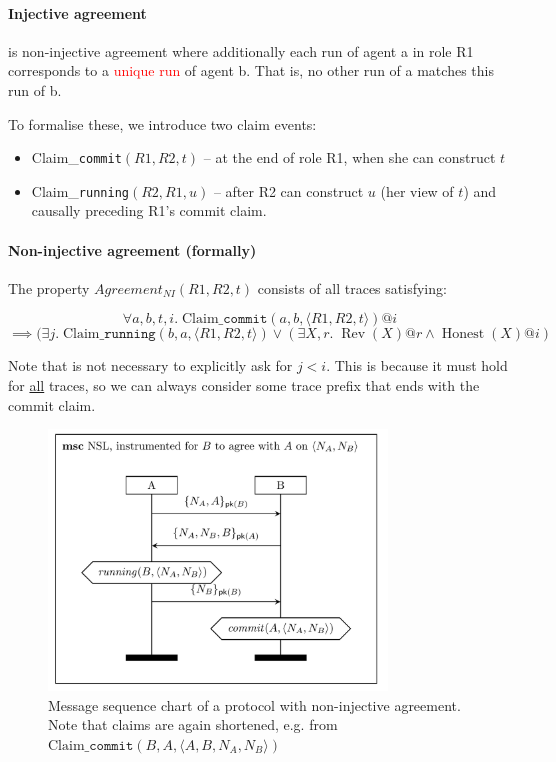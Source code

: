 \paragraph{Injective agreement} is non-injective agreement where additionally each run of agent a in role R1 corresponds to a \textcolor{red}{unique run} of agent b. That is, no other run of a matches this run of b.

\horizontaldivider

To formalise these, we introduce two claim events:
\begin{itemize}
    \item Claim\_\texttt{commit}$(R1, R2, t)$ -- at the end of role R1, when she can construct $t$
    \item Claim\_\texttt{running}$(R2, R1, u)$ -- after R2 can construct $u$ (her view of $t$) and causally preceding R1's commit claim.
\end{itemize}

\paragraph{Non-injective agreement (formally)}
The property $Agreement_{NI}(R1, R2, t)$ consists of all traces satisfying:
\begin{tcolorbox}
$$ \forall a, b, t, i. \; \text{Claim\_}\texttt{commit}(a, b, \langle R1, R2, t \rangle)@i $$
$$ \implies (\exists j. \; \text{Claim\_}\texttt{running}(b, a, \langle R1, R2, t \rangle) \vee (\exists X, r . \; \operatorname{Rev}(X)@r \wedge \operatorname{Honest}(X)@i) $$
\end{tcolorbox}

Note that is not necessary to explicitly ask for $j < i$. This is because it must hold for \underline{all} traces, so we can always consider some trace prefix that ends with the commit claim.

\begin{figure}[h]
    \centering
    \includegraphics[width=9cm]{images/ch7-msc-auth-noninjective.png}
    \caption{Message sequence chart of a protocol with non-injective agreement. \newline Note that claims are again shortened, e.g. from $\text{Claim\_}\texttt{commit}(B, A, \langle A, B, N_A, N_B \rangle)$}
    \label{fig:msc-auth-noninjective}
\end{figure}

